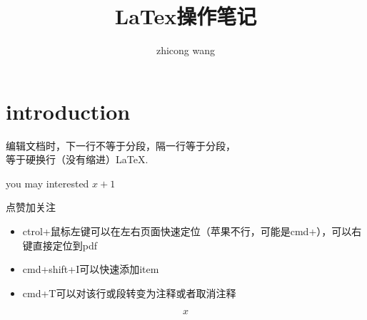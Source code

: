 \documentclass[11pt,a4paper]{article}
\title{LaTex操作笔记}
\author{zhicong wang}
\begin{document}
	\maketitle
	\section{introduction}
	编辑文档时，下一行不等于分段，隔一行等于分段，\\等于硬换行（没有缩进）\LaTeX.
	
	you may interested $x+1$
	
	点赞加关注
	\begin{itemize}
		\item ctrol+鼠标左键可以在左右页面快速定位（苹果不行，可能是cmd+），可以右键直接定位到pdf
		\item cmd+shift+I可以快速添加item
		\item cmd+T可以对该行或段转变为注释或者取消注释
	\end{itemize}
\[x\]
\end{document}
